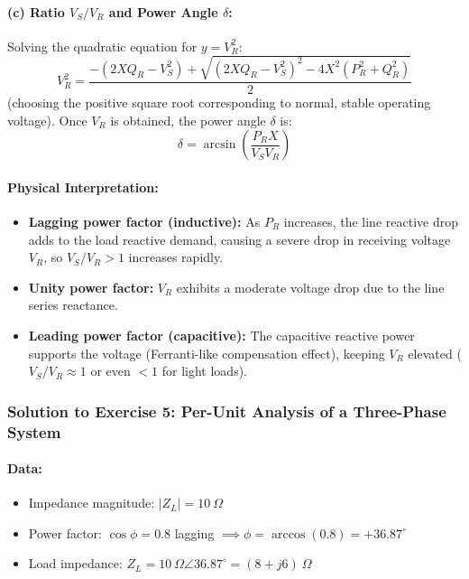 \paragraph{(c) Ratio $V_S/V_R$ and Power Angle $\delta$:}
Solving the quadratic equation for $y = V_R^2$:
\begin{equation}
    V_R^2 = \frac{-(2X Q_R - V_S^2) + \sqrt{(2X Q_R - V_S^2)^2 - 4 X^2(P_R^2 + Q_R^2)}}{2}
\end{equation}
(choosing the positive square root corresponding to normal, stable operating voltage).
Once $V_R$ is obtained, the power angle $\delta$ is:
\begin{equation}
    \delta = \arcsin\left(\frac{P_R X}{V_S V_R}\right)
\end{equation}

\paragraph{Physical Interpretation:}
\begin{itemize}
    \item \textbf{Lagging power factor (inductive):} As $P_R$ increases, the line reactive drop adds to the load reactive demand, causing a severe drop in receiving voltage $V_R$, so $V_S/V_R > 1$ increases rapidly.
    \item \textbf{Unity power factor:} $V_R$ exhibits a moderate voltage drop due to the line series reactance.
    \item \textbf{Leading power factor (capacitive):} The capacitive reactive power supports the voltage (Ferranti-like compensation effect), keeping $V_R$ elevated ($V_S/V_R \approx 1$ or even $< 1$ for light loads).
\end{itemize}

\subsubsection*{Solution to Exercise 5: Per-Unit Analysis of a Three-Phase System}
\paragraph{Data:}
\begin{itemize}
    \item Impedance magnitude: $|Z_L| = 10\ \Omega$
    \item Power factor: $\cos\phi = 0.8$ lagging $\implies \phi = \arccos(0.8) = +36.87^\circ$
    \item Load impedance: $Z_L = 10\ \Omega \angle 36.87^\circ = (8 + j6)\ \Omega$
\end{itemize}


